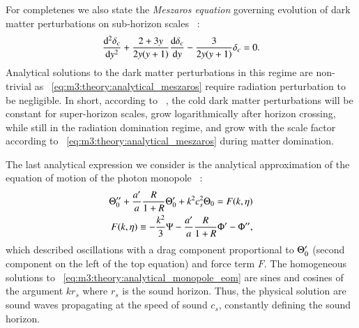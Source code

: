     For completenes we also state the \textit{Meszaros equation} governing evolution of dark matter perturbations on sub-horizon scales ~\cite[Eq. 8.59]{dodelson2020modern}:
    \begin{equation}\label{eq:m3:theory:analytical_meszaros}
        \dv[2]{\delta_c}{y} + \frac{2+3y}{2y(y+1)}\dv{\delta_c}{y} - \frac{3}{2y(y+1)}\delta_c = 0.
    \end{equation}
    Analytical solutions to the dark matter perturbations in this regime are non-trivial as ~\cref{eq:m3:theory:analytical_meszaros} require radiation perturbation to be negligible. In short, according to ~\cite{dodelson2020modern}, the cold dark matter perturbations will be constant for super-horizon scales, grow logarithmically after horizon crossing, while still in the radiation domination regime, and grow with the scale factor according to ~\cref{eq:m3:theory:analytical_meszaros} during matter domination. 

    The last analytical expression we consider is the analytical approximation of the equation of motion of the photon monopole ~\cite[Eq. 9.20]{dodelson2020modern}:
    \begin{equation}\label{eq:m3:theory:analytical_monopole_eom}
        \begin{split}
            \Theta_0''+\frac{a'}{a}\frac{R}{1+R}\Theta_0'+k^2c_s^2\Theta_0 = F(k,\eta) \\
            F(k,\eta) \equiv -\frac{k^2}{3}\Psi - \frac{a'}{a}\frac{R}{1+R}\Phi' - \Phi'',
        \end{split}
    \end{equation}
    which described oscillations with a drag component proportional to $\Theta_0'$ (second component on the left of the top equation) and force term $F$. The homogeneous solutions to ~\cref{eq:m3:theory:analytical_monopole_eom} are sines and cosines of the argument $k r_s$ where $r_s$ is the sound horizon. Thus, the physical solution are sound waves propagating at the speed of sound $c_s$,  constantly defining the sound horizon. 